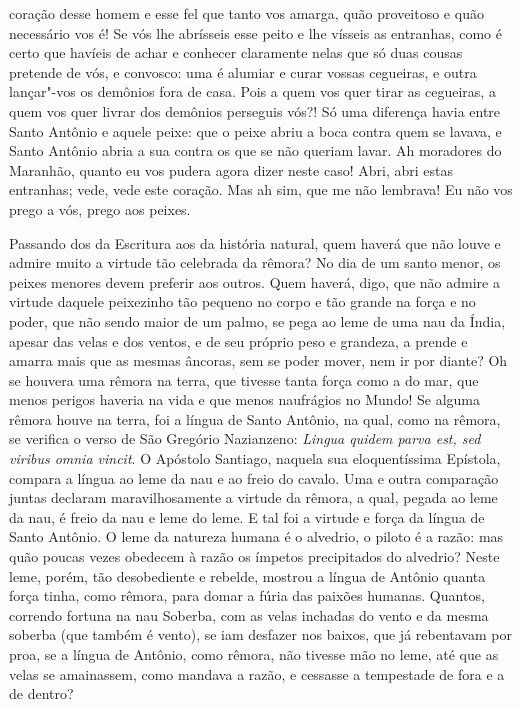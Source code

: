 coração desse homem e esse fel que tanto vos amarga, quão proveitoso e
quão necessário vos é! Se vós lhe abrísseis esse peito e lhe vísseis as
entranhas, como é certo que havíeis de achar e conhecer claramente nelas
que só duas cousas pretende de vós, e convosco: uma é alumiar e curar
vossas cegueiras, e outra lançar"-vos os demônios fora de casa.
Pois a quem vos quer tirar as cegueiras, a quem vos quer livrar dos
demônios perseguis vós?! Só uma diferença havia entre Santo Antônio e
aquele peixe: que o
peixe abriu a boca contra quem se lavava, e Santo Antônio abria a sua
contra os que se não queriam lavar.
Ah moradores do Maranhão, quanto eu vos pudera agora dizer neste caso!
Abri, abri estas entranhas; vede, vede este coração. Mas ah sim, que me
não lembrava! Eu não vos prego a vós, prego aos peixes.

Passando dos da Escritura aos da história natural, quem haverá que não
louve e admire muito a virtude tão celebrada da rêmora? No dia de um
santo menor, os peixes menores devem preferir aos outros. Quem haverá,
digo, que não admire a virtude daquele peixezinho tão pequeno no corpo e
tão grande na força e no poder, que não sendo maior de um palmo, se pega
ao leme de uma nau da Índia, apesar das velas e dos ventos, e de seu
próprio peso e grandeza, a prende e amarra mais que as mesmas âncoras,
sem se poder mover, nem ir por diante? Oh se houvera uma rêmora na
terra, que tivesse tanta força como a do mar, que menos perigos haveria
na vida e que menos naufrágios no Mundo!
Se alguma rêmora houve na terra, foi a língua de Santo Antônio, na qual,
como na rêmora, se verifica o verso de São Gregório Nazianzeno:
\emph{Lingua quidem parva est, sed viribus omnia vincit}. O Apóstolo
Santiago, naquela sua eloquentíssima Epístola, compara a língua ao leme
da nau e ao freio do cavalo. Uma e outra comparação juntas declaram
maravilhosamente a virtude da rêmora, a qual, pegada ao leme da nau, é
freio da nau e leme do leme. E tal foi a virtude e força da língua de
Santo Antônio. O leme da natureza humana é o alvedrio, o piloto é a
razão: mas quão poucas vezes obedecem à razão os ímpetos precipitados do
alvedrio? Neste leme, porém, tão desobediente e rebelde, mostrou a
língua de Antônio quanta força tinha, como rêmora, para domar a fúria
das paixões humanas. Quantos, correndo fortuna na nau Soberba, com as
velas inchadas do vento e da mesma soberba (que também é vento), se iam
desfazer nos baixos, que já rebentavam por proa, se a língua de Antônio,
como rêmora, não tivesse mão no leme, até que as velas se amainassem,
como mandava a razão, e cessasse a tempestade de fora e a de dentro?
